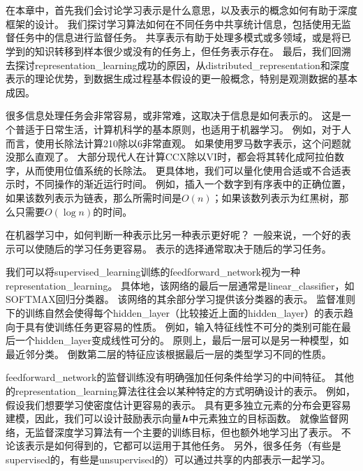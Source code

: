 \chapter{}
\label{chap:representation_learning}
在本章中，首先我们会讨论学习表示是什么意思，以及表示的概念如何有助于深度框架的设计。
我们探讨学习算法如何在不同任务中共享统计信息，包括使用无监督任务中的信息进行监督任务。
共享表示有助于处理多模式或多领域，或是将已学到的知识转移到样本很少或没有的任务上，但任务表示存在。
最后，我们回溯去探讨\gls{representation_learning}成功的原因，从\gls{distributed_representation}\citep{Hinton-et-al-PDP1986}和深度表示的理论优势，到数据生成过程基本假设的更一般概念，特别是观测数据的基本成因。


很多信息处理任务会非常容易，或非常难，这取决于信息是如何表示的。
这是一个普适于日常生活，计算机科学的基本原则，也适用于机器学习。
例如，对于人而言，使用长除法计算210除以6非常直观。
如果使用罗马数字表示，这个问题就没那么直观了。
大部分现代人在计算CCX除以VI时，都会将其转化成阿拉伯数字，从而使用位值系统的长除法。
更具体地，我们可以量化使用合适或不合适表示时，不同操作的渐近运行时间。
例如，插入一个数字到有序表中的正确位置，如果该数列表示为链表，那么所需时间是$O(n)$；如果该数列表示为红黑树，那么只需要$O(\log n)$的时间。


在机器学习中，如何判断一种表示比另一种表示更好呢？
一般来说，一个好的表示可以使随后的学习任务更容易。
表示的选择通常取决于随后的学习任务。


我们可以将\gls{supervised_learning}训练的\gls{feedforward_network}视为一种\gls{representation_learning}。
具体地，该网络的最后一层通常是\gls{linear_classifier}，如SOFTMAX回归分类器。
该网络的其余部分学习提供该分类器的表示。
监督准则下的训练自然会使得每个\gls{hidden_layer}（比较接近上面的\gls{hidden_layer}）的表示趋向于具有使训练任务更容易的性质。
例如，输入特征线性不可分的类别可能在最后一个\gls{hidden_layer}变成线性可分的。
原则上，最后一层可以是另一种模型，如最近邻分类\citep{SalakhutdinovR2007-small}。
倒数第二层的特征应该根据最后一层的类型学习不同的性质。


\gls{feedforward_network}的监督训练没有明确强加任何条件给学习的中间特征。
其他的\gls{representation_learning}算法往往会以某种特定的方式明确设计的表示。
例如，假设我们想要学习使密度估计更容易的表示。
具有更多独立元素的分布会更容易建模，因此，我们可以设计鼓励表示向量$\boldsymbol{\mathit{h}}$中元素独立的目标函数。
就像监督网络，无监督深度学习算法有一个主要的训练目标，但也额外地学习出了表示。
不论该表示是如何得到的，它都可以运用于其他任务。
另外，很多任务（有些是\gls{supervised}的，有些是\gls{unsupervised}的）可以通过共享的内部表示一起学习。


